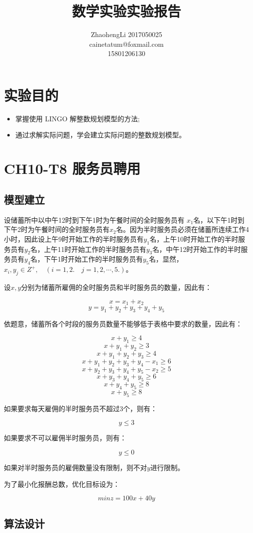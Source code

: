 \documentclass{article}
\title{数学实验实验报告}
\author{ZhaohengLi 2017050025\\cainetatum@foxmail.com\\15801206130}
\begin{document}
\maketitle
\section{实验目的}
\begin{itemize}
	\item{掌握使用 LINGO 解整数规划模型的方法;}
	\item{通过求解实际问题，学会建立实际问题的整数规划模型。}
\end{itemize}


\section{CH10-T8 服务员聘用}

\subsection{模型建立}
设储蓄所中以中午12时到下午1时为午餐时间的全时服务员有 $x_1$名，以下午1时到下午2时为午餐时间的全时服务员有$x_2$名。因为半时服务员必须在储蓄所连续工作4小时，因此设上午9时开始工作的半时服务员有$y_1$名，上午10时开始工作的半时服务员有$y_2$名，上午11时开始工作的半时服务员有$y_3$名，中午12时开始工作的半时服务员有$y_4$名，下午1时开始工作的半时服务员有$y_5$名，显然，$x_i,y_j\in Z^+,\quad (i=1,2.\quad j=1,2,\cdots,5.)$。

设$x,y$分别为储蓄所雇佣的全时服务员和半时服务员的数量，因此有：

$$x=x_1+x_2$$
$$y=y_1+y_2+y_3+y_4+y_5$$

依题意，储蓄所各个时段的服务员数量不能够低于表格中要求的数量，因此有：

$$x+y_1 \geq 4$$
$$x+y_1+y_2 \geq 3$$
$$x+y_1+y_2+y_3 \geq 4$$
$$x+y_1+y_2+y_3+y_4-x_1 \geq 6$$
$$x+y_2+y_3+y_4+y_5-x_2 \geq 5$$
$$x+y_3+y_4+y_5 \geq 6$$
$$x+y_4+y_5 \geq 8$$
$$x+y_5 \geq 8$$

如果要求每天雇佣的半时服务员不超过3个，则有：

$$y\leq3$$

如果要求不可以雇佣半时服务员，则有：

$$y\leq0$$

如果对半时服务员的雇佣数量没有限制，则不对$y$进行限制。

为了最小化报酬总数，优化目标设为：

$$min z = 100x+40y$$

\subsection{算法设计}
\end{document}
